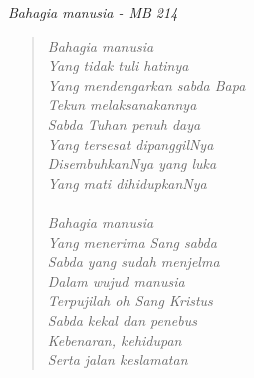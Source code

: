 \small
\begin{center}
\itshape{Bahagia manusia - MB 214}
\end{center}
\begin{verse}
\itshape{
Bahagia manusia\\
Yang tidak tuli hatinya\\
Yang mendengarkan sabda Bapa\\
Tekun melaksanakannya\\
Sabda Tuhan penuh daya\\
Yang tersesat dipanggilNya\\
DisembuhkanNya yang luka\\
Yang mati dihidupkanNya\\
{~}\\
Bahagia manusia\\
Yang menerima Sang sabda\\
Sabda yang sudah menjelma\\
Dalam wujud manusia\\
Terpujilah oh Sang Kristus\\
Sabda kekal dan penebus\\
Kebenaran, kehidupan\\
Serta jalan keslamatan
}
\end{verse}
\normalsize